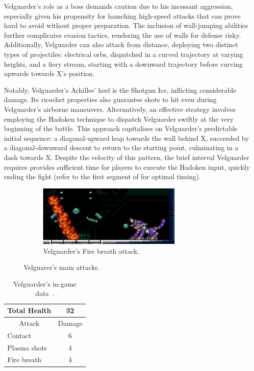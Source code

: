 Velguarder's role as a boss demands caution due to his incessant aggression, especially given his propensity for launching high-speed attacks that can prove hard to avoid without proper preparation. The inclusion of wall-jumping abilities further complicates evasion tactics, rendering the use of walls for defense risky. Additionally, Velguarder can also attack from distance, deploying two distinct types of projectiles: electrical orbs, dispatched in a curved trajectory at varying heights, and a fiery stream, starting with a downward trajectory before curving upwards towards X's position.

Notably, Velguarder's Achilles' heel is the Shotgun Ice, inflicting considerable damage. Its ricochet properties also guarantee shots to hit even during Velguarder's airborne maneuvers. Alternatively, an effective strategy involves employing the Hadoken technique to dispatch Velguarder swiftly at the very beginning of the battle. This approach capitalizes on Velguarder's predictable initial sequence: a diagonal-upward leap towards the wall behind X, succeeded by a diagonal-downward descent to return to the starting point, culminating in a dash towards X. Despite the velocity of this pattern, the brief interval Velguarder requires provides sufficient time for players to execute the Hadoken input, quickly ending the fight (refer to the first segment of  for optimal timing).

\begin{figure}[htp]
	\ContinuedFloat
	\centering
	\begin{subfigure}[t]{\linewidth}
		\centering
		\includegraphics[height=3cm]{figures/X1/Sigma_stages/Velguarder_fire.jpg}
		\caption{Velguarder's Fire breath attack.}
	\end{subfigure}
	\caption{Velguarer's main attacks.}
\end{figure} 
\begin{table}
	\centering
	\begin{tabular}[h]{l c}
		\toprule
		Total Health  & 32\\
		\midrule
		\multicolumn{1}{c}{Attack} & \multicolumn{1}{c}{Damage}\\
		Contact & 6\\
		Plasma shots& 4\\
		Fire breath& 4\\
		\bottomrule
	\end{tabular}
	\caption{Velguarder's in-game data~\cite{wiki:Velguarder}.}
\end{table}


